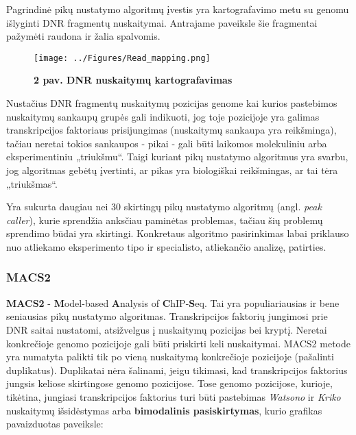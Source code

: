 \documentclass[12pt]{article}
\begin{document}
Pagrindinė pikų nustatymo algoritmų įvestis yra kartografavimo metu su genomu
išlyginti DNR fragmentų nuskaitymai. Antrajame paveiksle šie fragmentai pažymėti
raudona ir žalia spalvomis.

\begin{figure}[ht]
    \begin{center}
        \texttt{[image: ../Figures/Read\_mapping.png]}
        \vspace{-1\baselineskip}
        \caption*{\small\textbf{2 pav. DNR nuskaitymų kartografavimas}}
        \label{fig:birds}
    \end{center}
\end{figure}

Nustačius DNR fragmentų nuskaitymų pozicijas genome kai kurios pastebimos
nuskaitymų sankaupų grupės gali indikuoti, jog toje pozicijoje yra galimas
transkripcijos faktoriaus prisijungimas (nuskaitymų sankaupa yra reikšminga),
tačiau neretai tokios sankaupos - pikai - gali būti laikomos molekuliniu arba
eksperimentiniu „triukšmu“. Taigi kuriant pikų nustatymo algoritmus yra
svarbu, jog algoritmas gebėtų įvertinti, ar pikas yra biologiškai reikšmingas,
ar tai tėra „triukšmas“.

Yra sukurta daugiau nei 30 skirtingų pikų nustatymo algoritmų (angl.
\emph{peak caller}), kurie sprendžia anksčiau paminėtas problemas,
tačiau šių problemų sprendimo būdai yra skirtingi. Konkretaus algoritmo
pasirinkimas labai priklauso nuo atliekamo eksperimento tipo ir specialisto,
atliekančio analizę, patirties\cite{ARTICLE13}.

\subsubsection{MACS2}
\textbf{MACS2} - \textbf{M}odel-based \textbf{A}nalysis of
\textbf{C}hIP-\textbf{S}eq. Tai yra populiariausias ir bene seniausias
pikų nustatymo algoritmas.
Transkripcijos faktorių jungimosi prie DNR saitai nustatomi, atsižvelgus į
nuskaitymų pozicijas bei kryptį. Neretai konkrečioje genomo pozicijoje gali
būti priskirti keli nuskaitymai. MACS2 metode yra numatyta palikti tik po
vieną nuskaitymą konkrečioje pozicijoje (pašalinti duplikatus). Duplikatai
nėra šalinami, jeigu tikimasi, kad transkripcijos faktorius jungsis keliose
skirtingose genomo pozicijose. Tose genomo pozicijose, kurioje, tikėtina,
jungiasi transkripcijos faktorius turi būti pastebimas \emph{Watsono} ir
\emph{Kriko} nuskaitymų išsidėstymas arba \textbf{bimodalinis pasiskirtymas},
kurio grafikas pavaizduotas paveiksle:
\end{document}
